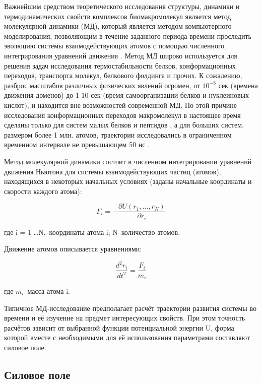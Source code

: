 Важнейшим средством теоретического исследования структуры, динамики и термодинамических свойств комплексов биомакромолекул является метод молекулярной динамики (МД), который является методом компьютерного моделирования, позволяющим в течение заданного периода времени проследить эволюцию системы взаимодействующих атомов с помощью численного интегрирования уравнений движения \cite{Alder1957,Gibson1960}. Метод МД широко используется для решения задач исследования термостабильности белков, конформационных переходов, транспорта молекул, белкового фолдинга и прочих. К сожалению, разброс масштабов различных физических явлений огромен, от $10^{-8}$ сек (времена движения доменов) до 1-10 сек (время самоорганизации белков и нуклеиновых кислот), и находится вне возможностей современной МД. По этой причине исследования конформационных переходов макромолекул в настоящее время сделаны только для систем малых белков и пептидов \cite{Zhou2002,Nymeyer2003}, а для больших систем, размером более 1 млн. атомов, траектории исследовались в ограниченном временном интервале не превышающем 50 нс \cite{Freddolino2006}. 

Метод молекулярной динамики состоит в численном интегрировании уравнений движения Ньютона для системы взаимодействующих частиц (атомов), находящихся в некоторых начальных условиях (заданы начальные координаты и скорости каждого атома):

\[
F_i = -\frac{\partial U(r_1,\ldots,r_N)}{\partial r_i}
\]

где i = 1 \ldots N,--координаты атома i; N--количество атомов.

Движение атомов описывается уравнениями:

\begin{equation}
\label{eq:newton_motion}
\frac{d^2r_i}{dt^2}=\frac{F_i}{m_i}
\end{equation}

где $m_i$--масса атома i.

Типичное МД-исследование предполагает расчёт траектории развития системы во времени и её изучение на предмет интересующих свойств. При этом точность расчётов зависит от выбранной функции потенциальной энергии U, форма которой вместе с необходимыми для её использования параметрами составляют силовое поле. 

\subsection{Силовое поле} \label{sect_methods_orcefield}

